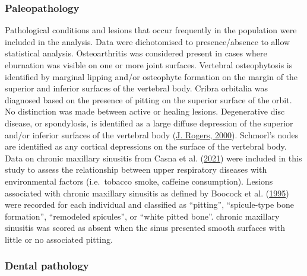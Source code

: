 \documentclass[
  letterpaper,
]{book}
\begin{document}
\hypertarget{paleopathology}{%
\subsubsection{Paleopathology}\label{paleopathology}}

Pathological conditions and lesions that occur frequently in the
population were included in the analysis. Data were dichotomised to
presence/absence to allow statistical analysis. Osteoarthritis was
considered present in cases where eburnation was visible on one or more
joint surfaces. Vertebral osteophytosis is identified by marginal
lipping and/or osteophyte formation on the margin of the superior and
inferior surfaces of the vertebral body. Cribra orbitalia was diagnosed
based on the presence of pitting on the superior surface of the orbit.
No distinction was made between active or healing lesions. Degenerative
disc disease, or spondylosis, is identified as a large diffuse
depression of the superior and/or inferior surfaces of the vertebral
body (\protect\hyperlink{ref-rogersPalaeopathologyJoint2000}{J. Rogers,
2000}). Schmorl's nodes are identified as any cortical depressions on
the surface of the vertebral body. Data on chronic maxillary sinusitis
from Casna et al.
(\protect\hyperlink{ref-casnaUrbanizationRespiratory2021}{2021}) were
included in this study to assess the relationship between upper
respiratory diseases with environmental factors (i.e.~tobacco smoke,
caffeine consumption). Lesions associated with chronic maxillary
sinusitis as defined by Boocock et al.
(\protect\hyperlink{ref-boocockMaxillarySinusitis1995}{1995}) were
recorded for each individual and classified as ``pitting'',
``spicule-type bone formation'', ``remodeled spicules'', or ``white
pitted bone''. chronic maxillary sinusitis was scored as absent when the
sinus presented smooth surfaces with little or no associated pitting.

\hypertarget{dental-pathology}{%
\subsubsection{Dental pathology}\label{dental-pathology}}
\end{document}

